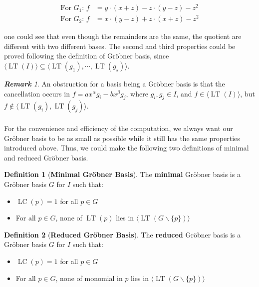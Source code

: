 \documentclass{article}
\newcommand{\lt}{\ensuremath{\operatorname{LT}}}
\newcommand{\lc}{\ensuremath{\operatorname{LC}}}
\theoremstyle{definition}
\newtheorem{definition}{Definition}[section]
\theoremstyle{remark}
\newtheorem*{remark}{\textbf{Remark}}
\theoremstyle{example}
\begin{document}
\begin{align}
        \text{For } G_1 \text{: } f &= y\cdot(x+z) - z\cdot (y-z) - z^2\\
        \text{For } G_2 \text{: } f &= x\cdot(y-z) + z\cdot (x+z) - z^2
\end{align}

one could see that even though the remainders are the same, the quotient are different with two different bases. The second and third properties could be proved following the definition of Gröbner basis, since $\langle \lt(I) \rangle \subseteq \langle \lt(g_1),\cdots, \lt(g_s) \rangle$.


\begin{remark}
    An obstruction for a basis being a Gröbner basis is that the cancellation occurs in $f = ax^{\alpha}g_i - bx^{\beta}g_{j}$, where $g_i,g_j \in I$, and $f \in \langle \lt(I) \rangle$, but $f \notin \langle \lt(g_i), \lt(g_j)\rangle$.
\end{remark}

\paragraph{}

For the convenience and efficiency of the computation, we always want our Gröbner basis to be as small as possible while it still has the same properties introduced above. Thus, we could make the following two definitions of minimal and reduced Gröbner basis.

\begin{definition}[\textbf{Minimal Gröbner Basis}]
    The \textbf{minimal} Gröbner basis is a Gröbner basis  $G$ for $I$ such that:
    \begin{itemize}
        \item $\lc(p) = 1$ for all $p \in G$
        \item For all $p \in G$, none of $\lt(p)$ lies in $\langle \lt(G\backslash\{p\}) \rangle$
    \end{itemize}
\end{definition}

\begin{definition}[\textbf{Reduced Gröbner Basis}]
    The \textbf{reduced} Gröbner basis is a Gröbner basis $G$ for $I$ such that:
    \begin{itemize}
        \item $\lc(p) = 1$ for all $p \in G$
        \item For all $p \in G$, none of monomial in $p$ lies in $\langle \lt(G\backslash\{p\})\rangle$
    \end{itemize}
\end{definition}
\end{document}
